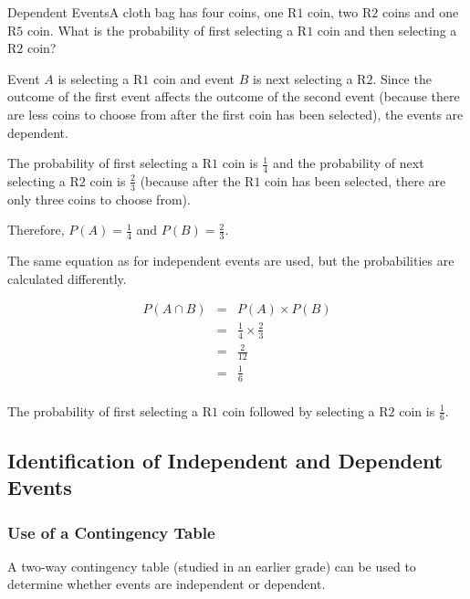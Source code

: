 \begin{wex}{Dependent Events}{A cloth bag has four coins, one R$1$ coin, two R$2$ coins and one R$5$ coin. What is the probability of first selecting a R$1$ coin and then selecting a R$2$ coin?\\}{

Event $A$ is selecting a R$1$ coin and event $B$ is next selecting a R$2$. Since the outcome of the first event affects the outcome of the second event (because there are less coins to choose from after the first coin has been selected), the events are dependent.\\


The probability of first selecting a R$1$ coin is $\frac{1}{4}$ and the probability of next selecting a R$2$ coin is $\frac{2}{3}$ (because after the R$1$ coin has been selected, there are only three coins to choose from).

Therefore, $P(A)=\frac{1}{4}$ and $P(B)=\frac{2}{3}$.\\


The same equation as for independent events are used, but the probabilities are calculated differently.

\begin{eqnarray*}
P(A \cap B) &=& P(A)\times P(B)\\
&=&\frac{1}{4} \times \frac{2}{3}\\
&=&\frac{2}{12}\\
&=&\frac{1}{6}\\
\end{eqnarray*}

The probability of first selecting a R$1$ coin followed by selecting a R$2$ coin is $\frac{1}{6}$.}
\end{wex}

\subsection{Identification of Independent and Dependent Events}
\subsubsection{Use of a Contingency Table}
A two-way contingency table (studied in an earlier grade) can be used to determine whether events are independent or dependent.

